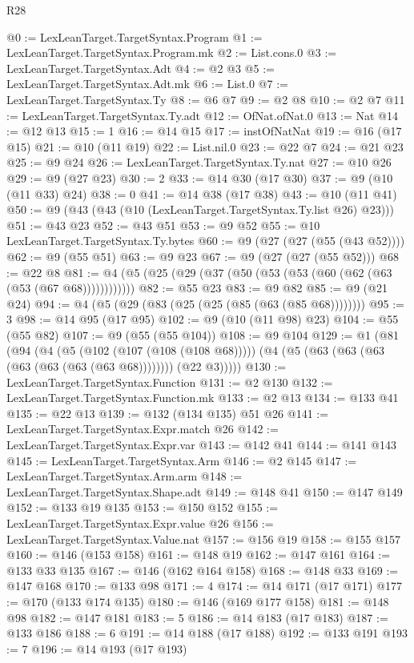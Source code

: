 \begin{lexlean}{R28}
\begin{coremodule}
@0 := LexLeanTarget.TargetSyntax.Program
@1 := LexLeanTarget.TargetSyntax.Program.mk
@2 := List.cons.{0}
@3 := LexLeanTarget.TargetSyntax.Adt
@4 := @2 @3
@5 := LexLeanTarget.TargetSyntax.Adt.mk
@6 := List.{0}
@7 := LexLeanTarget.TargetSyntax.Ty
@8 := @6 @7
@9 := @2 @8
@10 := @2 @7
@11 := LexLeanTarget.TargetSyntax.Ty.adt
@12 := OfNat.ofNat.{0}
@13 := Nat
@14 := @12 @13
@15 := 1
@16 := @14 @15
@17 := instOfNatNat
@19 := @16 (@17 @15)
@21 := @10 (@11 @19)
@22 := List.nil.{0}
@23 := @22 @7
@24 := @21 @23
@25 := @9 @24
@26 := LexLeanTarget.TargetSyntax.Ty.nat
@27 := @10 @26
@29 := @9 (@27 @23)
@30 := 2
@33 := @14 @30 (@17 @30)
@37 := @9 (@10 (@11 @33) @24)
@38 := 0
@41 := @14 @38 (@17 @38)
@43 := @10 (@11 @41)
@50 := @9 (@43 (@43 (@10 (LexLeanTarget.TargetSyntax.Ty.list @26) @23)))
@51 := @43 @23
@52 := @43 @51
@53 := @9 @52
@55 := @10 LexLeanTarget.TargetSyntax.Ty.bytes
@60 := @9 (@27 (@27 (@55 (@43 @52))))
@62 := @9 (@55 @51)
@63 := @9 @23
@67 := @9 (@27 (@27 (@55 @52)))
@68 := @22 @8
@81 := @4 (@5 (@25 (@29 (@37 (@50 (@53 (@53 (@60 (@62 (@63 (@53 (@67 @68))))))))))))
@82 := @55 @23
@83 := @9 @82
@85 := @9 (@21 @24)
@94 := @4 (@5 (@29 (@83 (@25 (@25 (@85 (@63 (@85 @68))))))))
@95 := 3
@98 := @14 @95 (@17 @95)
@102 := @9 (@10 (@11 @98) @23)
@104 := @55 (@55 @82)
@107 := @9 (@55 (@55 @104))
@108 := @9 @104
@129 := @1
    (@81
      (@94
        (@4
          (@5 (@102 (@107 (@108 (@108 @68)))))
          (@4 (@5 (@63 (@63 (@63 (@63 (@63 (@63 (@63 @68)))))))) (@22 @3)))))
@130 := LexLeanTarget.TargetSyntax.Function
@131 := @2 @130
@132 := LexLeanTarget.TargetSyntax.Function.mk
@133 := @2 @13
@134 := @133 @41
@135 := @22 @13
@139 := @132 (@134 @135) @51 @26
@141 := LexLeanTarget.TargetSyntax.Expr.match @26
@142 := LexLeanTarget.TargetSyntax.Expr.var
@143 := @142 @41
@144 := @141 @143
@145 := LexLeanTarget.TargetSyntax.Arm
@146 := @2 @145
@147 := LexLeanTarget.TargetSyntax.Arm.arm
@148 := LexLeanTarget.TargetSyntax.Shape.adt
@149 := @148 @41
@150 := @147 @149
@152 := @133 @19 @135
@153 := @150 @152
@155 := LexLeanTarget.TargetSyntax.Expr.value @26
@156 := LexLeanTarget.TargetSyntax.Value.nat
@157 := @156 @19
@158 := @155 @157
@160 := @146 (@153 @158)
@161 := @148 @19
@162 := @147 @161
@164 := @133 @33 @135
@167 := @146 (@162 @164 @158)
@168 := @148 @33
@169 := @147 @168
@170 := @133 @98
@171 := 4
@174 := @14 @171 (@17 @171)
@177 := @170 (@133 @174 @135)
@180 := @146 (@169 @177 @158)
@181 := @148 @98
@182 := @147 @181
@183 := 5
@186 := @14 @183 (@17 @183)
@187 := @133 @186
@188 := 6
@191 := @14 @188 (@17 @188)
@192 := @133 @191
@193 := 7
@196 := @14 @193 (@17 @193)

\end{coremodule}
\end{lexlean}
